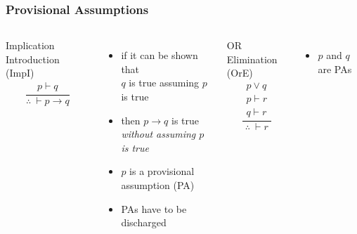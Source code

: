\documentclass[dvipsnames]{beamer}
\begin{document}
\begin{frame}
  \frametitle{Provisional Assumptions}

  \begin{columns}[t]
    \begin{block}{Implication Introduction (ImpI)}
      \[
      \frac
        {
          \begin{array}{c}
            p \vdash q
          \end{array}
        }
        {
          \therefore ~ \vdash p \rightarrow q
        }
      \]
    \end{block}

    \begin{itemize}
      \item if it can be shown that\\
        $q$ is true assuming $p$ is true
      \item then $p \rightarrow q$ is true\\
        \emph{without assuming $p$ is true}

      \pause
      \medskip
      \item $p$ is a \alert{provisional assumption} (PA)
      \item PAs have to be \alert{discharged}
    \end{itemize}

    \pause
    \begin{block}{OR Elimination (OrE)}
      \[
      \frac
        {
          \begin{array}{c}
            p \vee q\\
            p \vdash r\\
            q \vdash r
          \end{array}
        }
        {
          \therefore ~ \vdash r
        }
      \]
    \end{block}

    \begin{itemize}
      \item $p$ and $q$ are PAs
    \end{itemize}
  \end{columns}
\end{frame}
\end{document}
